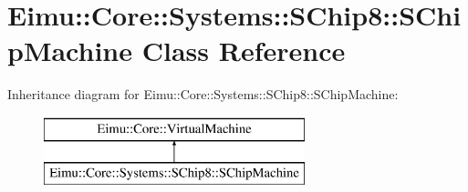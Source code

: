 \hypertarget{class_eimu_1_1_core_1_1_systems_1_1_s_chip8_1_1_s_chip_machine}{
\section{Eimu::Core::Systems::SChip8::SChipMachine Class Reference}
\label{class_eimu_1_1_core_1_1_systems_1_1_s_chip8_1_1_s_chip_machine}
}
Inheritance diagram for Eimu::Core::Systems::SChip8::SChipMachine:\begin{figure}[H]
\begin{center}
\leavevmode
\includegraphics[height=2.000000cm]{class_eimu_1_1_core_1_1_systems_1_1_s_chip8_1_1_s_chip_machine}
\end{center}
\end{figure}
